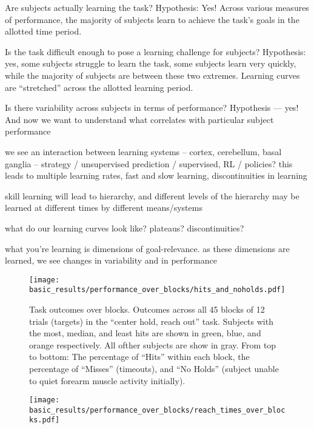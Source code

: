 \documentclass[../main.tex]{subfiles}
\begin{document}
Are subjects actually learning the task? 
    Hypothesis: Yes! Across various measures of performance, the majority of subjects learn to achieve the task’s goals in the allotted time period.

Is the task difficult enough to pose a learning challenge for subjects?
    Hypothesis: yes, some subjects struggle to learn the task, some subjects learn very quickly, while the majority of subjects are between these two extremes. Learning curves are “stretched” across the allotted learning period.


Is there variability across subjects in terms of performance?
    Hypothesis --- yes! And now we want to understand what correlates with particular subject performance


we see an interaction between learning systems -- cortex, cerebellum, basal ganglia -- strategy / unsupervised prediction / supervised, RL / policies? this leads to multiple learning rates, fast and slow learning, discontinuities in learning

skill learning will lead to hierarchy, and different levels of the hierarchy may be learned at different times by different means/systems

what do our learning curves look like? plateaus? discontinuities?

what you're learning is dimensions of goal-relevance. as these dimensions are learned, we see changes in variability and in performance


\begin{figure}[tph]
    \centering
    \texttt{[image: basic\_results/performance\_over\_blocks/hits\_and\_noholds.pdf]}
    \caption[Hit counts over trials]{Task outcomes over blocks. Outcomes across all 45 blocks of 12 trials (targets) in the ``center hold, reach out'' task. Subjects with the most, median, and least hits are shown in green, blue, and orange respectively. All ofther subjects are show in gray. From top to bottom: The percentage of ``Hits'' within each block, the percentage of ``Misses'' (timeouts), and ``No Holds'' (subject unable to quiet forearm muscle activity initially).}\label{fig:hits_and_noholds}
\end{figure}


\begin{figure}[tph]
    \centering
    \texttt{[image: basic\_results/performance\_over\_blocks/reach\_times\_over\_blocks.pdf]}
    \caption[Reach time over trials]{}\label{fig:reach_times_over_blocks}
\end{figure}
\end{document}
